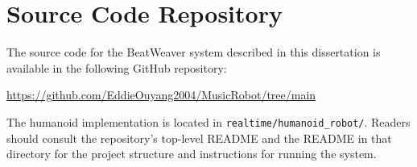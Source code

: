 
\chapter{Source Code Repository}
\label{app:source_code}

The source code for the BeatWeaver system described in this dissertation is
available in the following GitHub repository:

\begin{center}
    \url{https://github.com/EddieOuyang2004/MusicRobot/tree/main}
\end{center}

The humanoid implementation is located in
\texttt{realtime/humanoid\_robot/}. Readers should consult the repository's
top-level README and the README in that directory for the project structure
and instructions for running the system.
